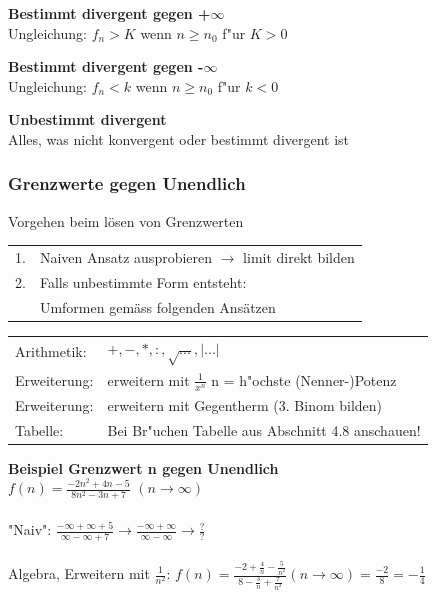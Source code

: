 			\textbf{Bestimmt divergent gegen +$\infty$} \\
				Ungleichung: $f_n > K$ wenn $n \geq  n_0$ f"ur $K > 0$ 
				
			\textbf{Bestimmt divergent gegen -$\infty$} \\
				Ungleichung: $f_n < k$ wenn $n \geq  n_0$ f"ur $k < 0$ 
				
			\textbf{Unbestimmt divergent} \\
				Alles, was nicht konvergent oder bestimmt divergent ist
				
		\subsubsection{Grenzwerte gegen Unendlich}
			Vorgehen beim lösen von Grenzwerten \\
				\begin{tabular}{ll}
					1. & Naiven Ansatz ausprobieren $\rightarrow$ limit direkt bilden \\
					2. & Falls unbestimmte Form entsteht: \\
					   & Umformen gemäss folgenden Ansätzen \\
				\end{tabular}
				
				\begin{tabular}{ll}
					Arithmetik:  & $+, -, *, :, \sqrt{...}, \vert ...\vert$ \\
					Erweiterung: & erweitern mit $\frac{1}{x^n}$ n = h"ochste (Nenner-)Potenz \\
					Erweiterung: & erweitern mit Gegentherm (3. Binom bilden)\\
					Tabelle:     & Bei Br"uchen Tabelle aus Abschnitt 4.8 anschauen! \\
				\end{tabular}

			\textbf{Beispiel Grenzwert n gegen Unendlich} \\
				$f(n) = \frac{-2n^2+4n-5}{8n^2-3n+7}$ $(n \rightarrow \infty)$ \\
				\\
				"Naiv": $\frac{-\infty + \infty + 5}{\infty - \infty + 7} \rightarrow \frac{-\infty + \infty}{\infty - \infty} \rightarrow \frac{?}{?}$ \\
				\\
				Algebra, Erweitern mit $\frac{1}{n^2}$: $f(n) = \frac{-2+\frac{4}{n}-\frac{5}{n^2}}{8-\frac{3}{n}+\frac{7}{n^2}} (n \rightarrow \infty) = \frac{-2}{8} = -\frac{1}{4}$ \\				
		
